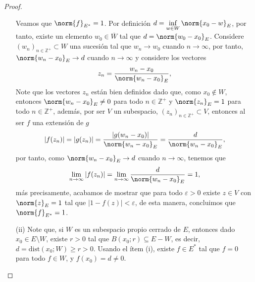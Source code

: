 \begin{proof}
\begin{enumerate}
        Veamos que $\norm{f}_{E^*}=1$. Por definición $\displaystyle d=\inf_{w \in W}\norm{x_0-w}_E$, por tanto, existe un elemento $w_0 \in \overline{W}$ tal que $d=\norm{w_0-x_0}_E$. Considere $(w_n)_{n \in \mathbb{Z}^+}\subset W$ una sucesión tal que $w_n\to w_0$ cuando $n \to \infty$, por tanto, $\norm{w_n-x_0}_E\to d$ cuando $n \to \infty$ y considere los vectores 
        \begin{align*}
            z_n=\dfrac{w_n-x_0}{\norm{w_n-x_0}_E},
        \end{align*}
        Note que los vectores $z_n$ están bien definidos dado que, como $x_0\notin W$, entonces $\norm{w_n-x_0}_E\neq 0$ para todo $n\in \mathbb{Z}^+$ y $\norm{z_n}_E=1$ para todo $n \in \mathbb{Z}^+$, además, por ser $V$ un subespacio, $(z_n)_{n \in \mathbb{Z}^+}\subset V$, entonces al ser $f$ una extensión de $g$
        \begin{align*}
            |f(z_n)|=|g(z_n)|=\frac{|g(w_n-x_0)|}{\norm{w_n-x_0}_E}=\frac{d}{\norm{w_n-x_0}_E},
        \end{align*}
        por tanto, como $\norm{w_n-x_0}_E \to d$ cuando $n \to \infty$, tenemos que
        \begin{align*}
            \lim_{n\to \infty}|f(z_n)|=\lim_{n\to \infty}\frac{d}{\norm{w_n-x_0}_E}=1,
        \end{align*}
        más precisamente, acabamos de mostrar que para todo $\varepsilon>0$ existe $z \in V$ con $\norm{z}_E=1$ tal que $|1-f(z)|<\varepsilon$, de esta manera, concluimos que $\norm{f}_{E^*}=1$.

        \item[(ii)] Note que, si $W$ es un subespacio propio cerrado de $E$, entonces dado $x_0 \in E\setminus W$, existe $r>0$ tal que $B(x_0;r)\subseteq E-W$, es decir, $d=\text{dist}(x_0;W)\geq r>0$. Usando el ítem (i), existe $f\in E^*$ tal que $f=0$ para todo $f \in W$, y $f(x_0)=d\neq 0$.
    \end{enumerate}
\end{proof}

